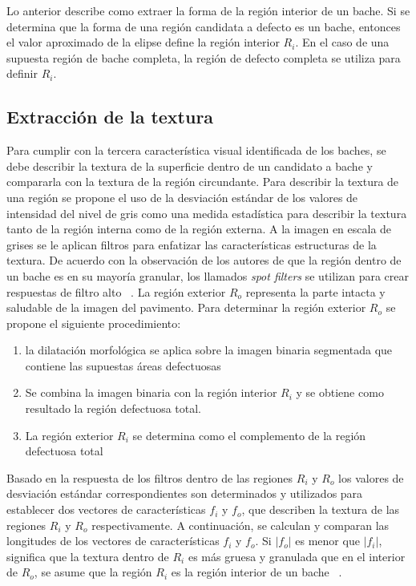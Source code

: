 	Lo anterior describe como  extraer la forma de la región interior de un bache. Si se determina que la forma de una región candidata a defecto es un
	bache, entonces el valor aproximado de la elipse define la región interior $R_i$. En el caso de una supuesta región de bache completa, la región de
	defecto completa se utiliza para definir $R_i$.

	\subsection{Extracción de la textura}

	Para cumplir con la tercera característica visual identificada de los baches, se debe describir la textura de la superficie dentro de un 
	candidato a bache y compararla con la textura de la región circundante. Para describir la textura de una región se propone el uso 
	de la desviación estándar de los valores de intensidad del nivel de gris como una medida estadística para describir la textura  tanto 
	de la región interna como de la región externa. A la imagen en escala de grises se le aplican filtros para enfatizar las características 
	estructuras de la textura. De acuerdo con la observación de los autores de que la región dentro de un bache es en su mayoría granular, 
	los llamados \emph{spot filters} se utilizan para crear respuestas de filtro alto ~. La región exterior
	$R_o$ representa la parte intacta y saludable de la imagen del pavimento.
	Para determinar la región exterior $R_o$ se propone el siguiente procedimiento:

	\begin{enumerate}
		\item la dilatación morfológica se aplica sobre la imagen binaria segmentada que contiene
		las supuestas áreas defectuosas
		\item Se combina la imagen binaria con la región interior $R_i$ y se obtiene como resultado la región defectuosa total.
		\item La región exterior $R_i$ se determina como el complemento de la región defectuosa total
	\end{enumerate}

	Basado en la respuesta de los filtros dentro de las regiones $R_i$ y $R_o$ los valores de desviación estándar correspondientes son
	determinados y utilizados para establecer dos vectores de características $f_i$ y $f_o$, que describen la textura de las regiones $R_i$ 
	y $R_o$ respectivamente. A continuación, se calculan y comparan las longitudes de los vectores de características $f_i$ y $f_o$.
	Si $|f_o|$  es menor que  $|f_i|$, significa que la textura dentro de $R_i$ es más gruesa y granulada que en el interior de $R_o$, se asume 
	que la región $R_i$ es la región interior de un bache ~.

